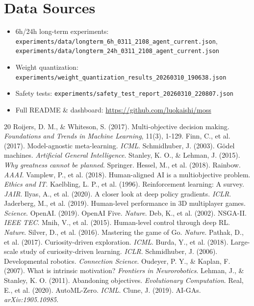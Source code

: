 \documentclass{article}
\begin{document}
\section*{Data Sources}
\begin{itemize}
\item 6h/24h long-term experiments: \texttt{experiments/data/longterm\_6h\_0311\_2108\_agent\_current.json}, \texttt{experiments/data/longterm\_24h\_0311\_2108\_agent\_current.json}
\item Weight quantization: \texttt{experiments/weight\_quantization\_results\_20260310\_190638.json}
\item Safety tests: \texttt{experiments/safety\_test\_report\_20260310\_220807.json}
\item Full README \& dashboard: \url{https://github.com/luokaishi/moss}
\end{itemize}


\begin{thebibliography}{20}
 Roijers, D. M., \& Whiteson, S. (2017). Multi-objective decision making. \textit{Foundations and Trends in Machine Learning}, 11(3), 1-129.
 Finn, C., et al. (2017). Model-agnostic meta-learning. \textit{ICML}.
 Schmidhuber, J. (2003). G{\"o}del machines. \textit{Artificial General Intelligence}.
 Stanley, K. O., \& Lehman, J. (2015). \textit{Why greatness cannot be planned}. Springer.
 Hessel, M., et al. (2018). Rainbow. \textit{AAAI}.
 Vamplew, P., et al. (2018). Human-aligned AI is a multiobjective problem. \textit{Ethics and IT}.
 Kaelbling, L. P., et al. (1996). Reinforcement learning: A survey. \textit{JAIR}.
 Ilyas, A., et al. (2020). A closer look at deep policy gradients. \textit{ICLR}.
 Jaderberg, M., et al. (2019). Human-level performance in 3D multiplayer games. \textit{Science}.
 OpenAI. (2019). OpenAI Five. \textit{Nature}.
 Deb, K., et al. (2002). NSGA-II. \textit{IEEE TEC}.
 Mnih, V., et al. (2015). Human-level control through deep RL. \textit{Nature}.
 Silver, D., et al. (2016). Mastering the game of Go. \textit{Nature}.
 Pathak, D., et al. (2017). Curiosity-driven exploration. \textit{ICML}.
 Burda, Y., et al. (2018). Large-scale study of curiosity-driven learning. \textit{ICLR}.
 Schmidhuber, J. (2006). Developmental robotics. \textit{Connection Science}.
 Oudeyer, P. Y., \& Kaplan, F. (2007). What is intrinsic motivation? \textit{Frontiers in Neurorobotics}.
 Lehman, J., \& Stanley, K. O. (2011). Abandoning objectives. \textit{Evolutionary Computation}.
 Real, E., et al. (2020). AutoML-Zero. \textit{ICML}.
 Clune, J. (2019). AI-GAs. \textit{arXiv:1905.10985}.
\end{thebibliography}
\end{document}
